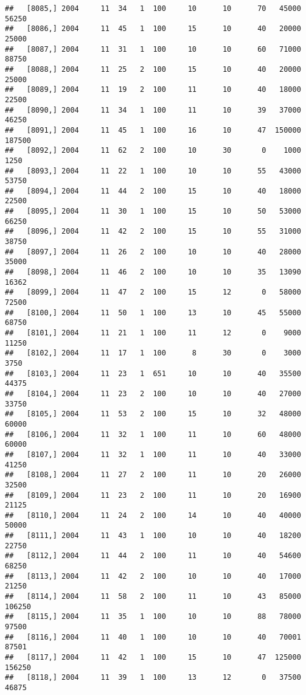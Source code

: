 \documentclass{article}\usepackage[]{graphicx}\usepackage[]{color}
\makeatletter
\newenvironment{kframe}{%
 \def\at@end@of@kframe{}%
 \ifinner\ifhmode%
  \def\at@end@of@kframe{\end{minipage}}%
  \begin{minipage}{\columnwidth}%
 \fi\fi%
 \def\FrameCommand##1{\hskip\@totalleftmargin \hskip-\fboxsep
 \colorbox{shadecolor}{##1}\hskip-\fboxsep
     \hskip-\linewidth \hskip-\@totalleftmargin \hskip\columnwidth}%
 \MakeFramed {\advance\hsize-\width
   \@totalleftmargin\z@ \linewidth\hsize
   \@setminipage}}%
 {\par\unskip\endMakeFramed%
 \at@end@of@kframe}
\newenvironment{knitrout}{}{} %
\makeatother
\begin{document}
\begin{knitrout}
\begin{kframe}
\begin{verbatim}
##   [8085,] 2004     11  34   1  100     10      10      70   45000   56250
##   [8086,] 2004     11  45   1  100     15      10      40   20000   25000
##   [8087,] 2004     11  31   1  100     10      10      60   71000   88750
##   [8088,] 2004     11  25   2  100     15      10      40   20000   25000
##   [8089,] 2004     11  19   2  100     11      10      40   18000   22500
##   [8090,] 2004     11  34   1  100     11      10      39   37000   46250
##   [8091,] 2004     11  45   1  100     16      10      47  150000  187500
##   [8092,] 2004     11  62   2  100     10      30       0    1000    1250
##   [8093,] 2004     11  22   1  100     10      10      55   43000   53750
##   [8094,] 2004     11  44   2  100     15      10      40   18000   22500
##   [8095,] 2004     11  30   1  100     15      10      50   53000   66250
##   [8096,] 2004     11  42   2  100     15      10      55   31000   38750
##   [8097,] 2004     11  26   2  100     10      10      40   28000   35000
##   [8098,] 2004     11  46   2  100     10      10      35   13090   16362
##   [8099,] 2004     11  47   2  100     15      12       0   58000   72500
##   [8100,] 2004     11  50   1  100     13      10      45   55000   68750
##   [8101,] 2004     11  21   1  100     11      12       0    9000   11250
##   [8102,] 2004     11  17   1  100      8      30       0    3000    3750
##   [8103,] 2004     11  23   1  651     10      10      40   35500   44375
##   [8104,] 2004     11  23   2  100     10      10      40   27000   33750
##   [8105,] 2004     11  53   2  100     15      10      32   48000   60000
##   [8106,] 2004     11  32   1  100     11      10      60   48000   60000
##   [8107,] 2004     11  32   1  100     11      10      40   33000   41250
##   [8108,] 2004     11  27   2  100     11      10      20   26000   32500
##   [8109,] 2004     11  23   2  100     11      10      20   16900   21125
##   [8110,] 2004     11  24   2  100     14      10      40   40000   50000
##   [8111,] 2004     11  43   1  100     10      10      40   18200   22750
##   [8112,] 2004     11  44   2  100     11      10      40   54600   68250
##   [8113,] 2004     11  42   2  100     10      10      40   17000   21250
##   [8114,] 2004     11  58   2  100     11      10      43   85000  106250
##   [8115,] 2004     11  35   1  100     10      10      88   78000   97500
##   [8116,] 2004     11  40   1  100     10      10      40   70001   87501
##   [8117,] 2004     11  42   1  100     15      10      47  125000  156250
##   [8118,] 2004     11  39   1  100     13      12       0   37500   46875

\end{verbatim}
\end{kframe}
\end{knitrout}
\end{document}
